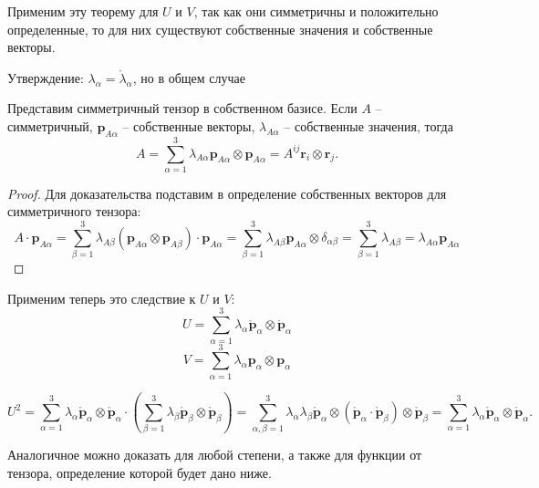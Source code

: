 \begin{corollary}
  Применим эту теорему для $U$ и $V$, так как они симметричны и положительно определенные, то для них существуют собственные значения и собственные векторы.
\end{corollary}

Утверждение: $\lambda_\alpha = \mathring{\lambda}_\alpha$, но в общем случае 

\begin{corollary}
  Представим симметричный тензор в собственном базисе. Если $A$ -- симметричный,
  $\mathbf{p}_{A\alpha}$ -- собственные векторы, $\lambda_{A\alpha}$ -- собственные значения,
  тогда
  \[
    A = \sum_{\alpha=1}^3 \lambda_{A\alpha} \mathbf{p}_{A\alpha} \otimes \mathbf{p}_{A\alpha}
    = A^{ij} \mathbf{r}_i \otimes \mathbf{r}_j.
  \]
\end{corollary}
\begin{proof}
  Для доказательства подставим в определение собственных векторов для симметричного тензора:
  \[
    A \cdot \mathbf{p}_{A\alpha}
    = \sum_{\beta=1}^3 \lambda_{A\beta} (\mathbf{p}_{A\alpha}\otimes \mathbf{p}_{A\beta}) \cdot \mathbf{p}_{A\alpha}
    = \sum_{\beta=1}^3 \lambda_{A\beta} \mathbf{p}_{A\alpha} \otimes \delta_{\alpha\beta}
    = \sum_{\beta=1}^3 \lambda_{A\beta} 
    = \lambda_{A\alpha} \mathbf{p}_{A\alpha}
  \]
\end{proof}

Применим теперь это следствие к $U$ и $V$:
\[
  U= \sum_{\alpha=1}^3 \lambda_\alpha \mathring{\mathbf{p}}_\alpha \otimes \mathring{\mathbf{p}}_\alpha
\]
\[
  V= \sum_{\alpha=1}^3 \lambda_\alpha \mathbf{p}_\alpha \otimes \mathbf{p}_\alpha

\]

\begin{corollary}
  \[
    U^2 = \sum_{\alpha=1}^3 \lambda_\alpha \mathring{\mathbf{p}}_\alpha \otimes \mathring{\mathbf{p}}_\alpha \cdot 
    \left( \sum_{\beta=1}^3 \lambda_\beta \mathring{\mathbf{p}}_\beta \otimes \mathring{\mathbf{p}}_\beta \right)
    = \sum_{\alpha, \beta = 1}^3 \lambda_\alpha \lambda_\beta \mathring{\mathbf{p}}_\alpha \otimes (\mathring{\mathbf{p}}_\alpha \cdot \mathring{\mathbf{p}}_\beta) \otimes \mathring{\mathbf{p}}_\beta
    = \sum_{\alpha=1}^3 \lambda_\alpha \mathring{\mathbf{p}}_\alpha \otimes \mathring{\mathbf{p}}_\alpha.
  \]

  Аналогичное можно доказать для любой степени, а также для функции от тензора, определение которой 
  будет дано ниже.
\end{corollary}

